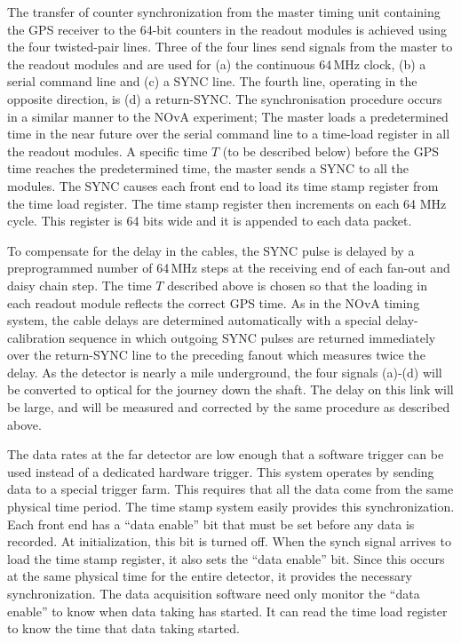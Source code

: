 The transfer of counter synchronization from the master timing unit containing the
GPS receiver to the 64-bit counters in the readout modules is achieved
using the four twisted-pair lines.  Three of the four lines send
signals from the master to the readout modules and are used for (a)
the continuous 64\,MHz clock, (b) a serial command line and (c) a SYNC
line. The fourth line, operating in the opposite direction, is (d) a
return-SYNC.  The synchronisation procedure occurs in a similar manner
to the NOvA experiment; The master loads a predetermined time in the
near future over the serial command line to a time-load register in
all the readout modules.  A specific time $T$ (to be described below)
before the GPS time reaches the predetermined time, the master sends a
SYNC to all the modules.  The SYNC causes each front end to load its
time stamp register from the time load register.  The time stamp
register then increments on each 64 MHz cycle.  This register is 64
bits wide and it is appended to each data packet.

To compensate for the delay in the cables, the SYNC pulse is delayed
by a preprogrammed number of 64\,MHz steps at the receiving end of
each fan-out and daisy chain step.  The time $T$ described above is
chosen so that the loading in each readout module reflects the correct
GPS time.  As in the NOvA timing system, the cable delays are
determined automatically with a special delay-calibration sequence in
which outgoing SYNC pulses are returned immediately over the
return-SYNC line to the preceding fanout which measures twice the
delay.  As the detector is nearly a mile underground, the four signals
(a)-(d) will be converted to optical for the journey down the shaft.
The delay on this link will be large, and will be measured and
corrected by the same procedure as described above.

The data rates at the far detector are low enough that a software
trigger can be used instead of a dedicated hardware trigger.  This
system operates by sending data to a special trigger farm.  This
requires that all the data come from the same physical time period.
The time stamp system easily provides this synchronization.  Each
front end has a ``data enable'' bit that must be set before any data is
recorded.  At initialization, this bit is turned off.  When the synch
signal arrives to load the time stamp register, it also sets the ``data
enable'' bit.  Since this occurs at the same physical time for the
entire detector, it provides the necessary synchronization.  The data
acquisition software need only monitor the ``data enable'' to know when
data taking has started.  It can read the time load register to know
the time that data taking started.

